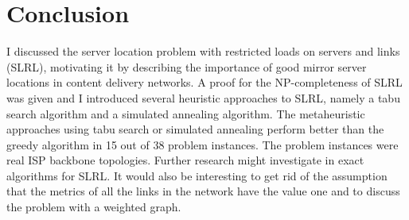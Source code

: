 \documentclass [12pt]{article}
\begin{document}
\section{Conclusion}
I discussed the server location problem with restricted loads on servers and links (SLRL), motivating it by describing the importance of good mirror server locations in content delivery networks.
A proof for the NP-completeness of SLRL was given and I introduced several heuristic approaches to SLRL, namely a tabu search algorithm and a simulated annealing algorithm.
The metaheuristic approaches using tabu search or simulated annealing perform better than the greedy algorithm in 15 out of 38 problem instances. The problem instances were
real ISP backbone topologies. Further research might investigate in exact algorithms for SLRL. It would also be interesting to get rid 
of the assumption that the metrics of all the links in the network have the value one and to discuss the problem with a weighted graph.
\newpage

\end{document}
